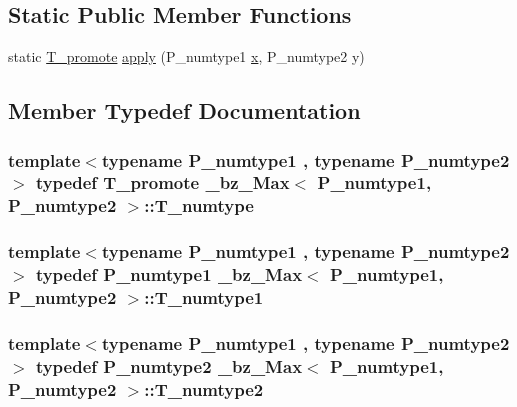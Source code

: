 \subsection*{Static Public Member Functions}
\begin{DoxyCompactItemize}
\item 
static \hyperlink{minmax_8h_aaa88a440c2f0d00798d5b1d42c79308d}{T\+\_\+promote} \hyperlink{class__bz__Max_adff9fadbeb14862418eeabaae3a31cbe}{apply} (P\+\_\+numtype1 \hyperlink{vecnorm1_8cc_ac73eed9e41ec09d58f112f06c2d6cb63}{x}, P\+\_\+numtype2 y)
\end{DoxyCompactItemize}


\subsection{Member Typedef Documentation}
\hypertarget{class__bz__Max_a2d3fc656c7448e085e9c61ccab4b7ddf}{}
\subsubsection[{T\+\_\+numtype}]{\setlength{\rightskip}{0pt plus 5cm}template$<$typename P\+\_\+numtype1 , typename P\+\_\+numtype2 $>$ typedef {\bf T\+\_\+promote} {\bf \+\_\+bz\+\_\+\+Max}$<$ P\+\_\+numtype1, P\+\_\+numtype2 $>$\+::{\bf T\+\_\+numtype}}\label{class__bz__Max_a2d3fc656c7448e085e9c61ccab4b7ddf}
\hypertarget{class__bz__Max_a9deab77fb52fb483561c3229432a1ead}{}
\subsubsection[{T\+\_\+numtype1}]{\setlength{\rightskip}{0pt plus 5cm}template$<$typename P\+\_\+numtype1 , typename P\+\_\+numtype2 $>$ typedef P\+\_\+numtype1 {\bf \+\_\+bz\+\_\+\+Max}$<$ P\+\_\+numtype1, P\+\_\+numtype2 $>$\+::{\bf T\+\_\+numtype1}}\label{class__bz__Max_a9deab77fb52fb483561c3229432a1ead}
\hypertarget{class__bz__Max_a932ec2ae9acd204707f1083db9ab5062}{}
\subsubsection[{T\+\_\+numtype2}]{\setlength{\rightskip}{0pt plus 5cm}template$<$typename P\+\_\+numtype1 , typename P\+\_\+numtype2 $>$ typedef P\+\_\+numtype2 {\bf \+\_\+bz\+\_\+\+Max}$<$ P\+\_\+numtype1, P\+\_\+numtype2 $>$\+::{\bf T\+\_\+numtype2}}\label{class__bz__Max_a932ec2ae9acd204707f1083db9ab5062}


